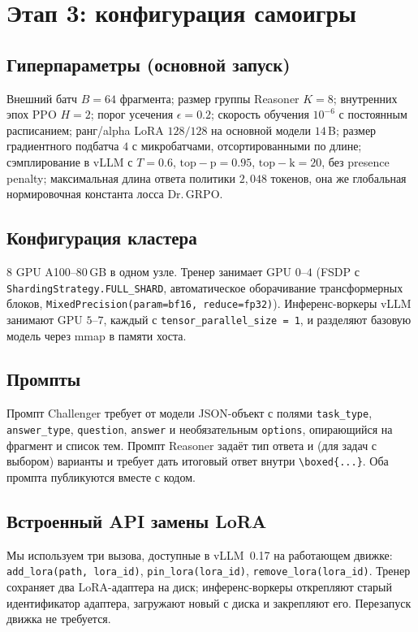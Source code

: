 \documentclass{article}
\begin{document}
\section{Этап 3: конфигурация самоигры}\label{app:selfplay}

\subsection{Гиперпараметры (основной запуск)}
Внешний батч $B = 64$ фрагмента; размер группы Reasoner $K = 8$; внутренних эпох PPO $H = 2$; порог усечения $\epsilon = 0.2$; скорость обучения $10^{-6}$ с постоянным расписанием; ранг/alpha LoRA $128/128$ на основной модели $14$\,B; размер градиентного подбатча $4$ с микробатчами, отсортированными по длине; сэмплирование в vLLM с $T = 0.6$, $\mathrm{top\!-\!p} = 0.95$, $\mathrm{top\!-\!k} = 20$, без presence penalty; максимальная длина ответа политики $2{,}048$ токенов, она же глобальная нормировочная константа лосса Dr.\,GRPO.

\subsection{Конфигурация кластера}
$8$ GPU A100--$80$\,GB в одном узле. Тренер занимает GPU $0$--$4$ (FSDP с \texttt{ShardingStrategy.FULL\_SHARD}, автоматическое оборачивание трансформерных блоков, \texttt{MixedPrecision(param=bf16, reduce=fp32)}). Инференс-воркеры vLLM занимают GPU $5$--$7$, каждый с \texttt{tensor\_parallel\_size = 1}, и разделяют базовую модель через mmap в памяти хоста.

\subsection{Промпты}
Промпт Challenger требует от модели JSON-объект с полями \texttt{task\_type}, \texttt{answer\_type}, \texttt{question}, \texttt{answer} и необязательным \texttt{options}, опирающийся на фрагмент и список тем. Промпт Reasoner задаёт тип ответа и (для задач с выбором) варианты и требует дать итоговый ответ внутри \verb|\boxed{...}|. Оба промпта публикуются вместе с кодом.

\subsection{Встроенный API замены LoRA}
Мы используем три вызова, доступные в vLLM~0.17 на работающем движке: \texttt{add\_lora(path, lora\_id)}, \texttt{pin\_lora(lora\_id)}, \texttt{remove\_lora(lora\_id)}. Тренер сохраняет два LoRA-адаптера на диск; инференс-воркеры открепляют старый идентификатор адаптера, загружают новый с диска и закрепляют его. Перезапуск движка не требуется.
\end{document}
